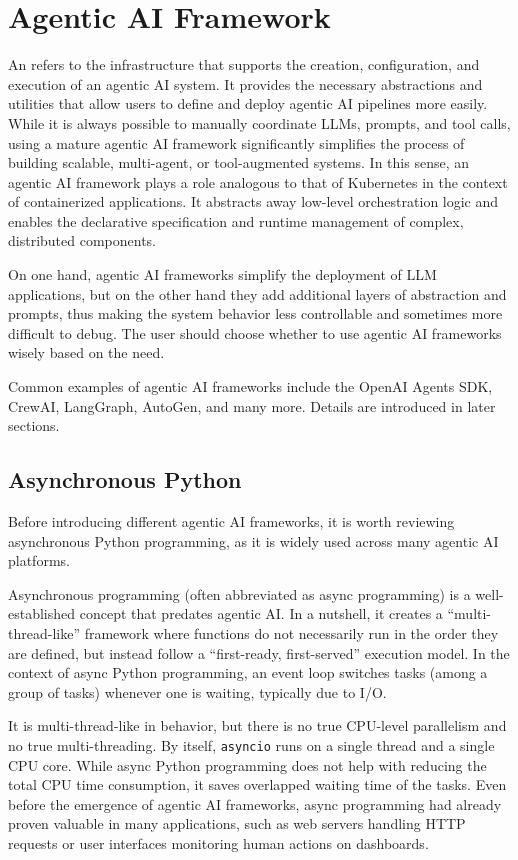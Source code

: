 \section{Agentic AI Framework} \label{sec:agentic_ai_frameworks}

An  refers to the infrastructure that supports the creation, configuration, and execution of an agentic AI system. It provides the necessary abstractions and utilities that allow users to define and deploy agentic AI pipelines more easily. While it is always possible to manually coordinate LLMs, prompts, and tool calls, using a mature agentic AI framework significantly simplifies the process of building scalable, multi-agent, or tool-augmented systems. In this sense, an agentic AI framework plays a role analogous to that of Kubernetes in the context of containerized applications. It abstracts away low-level orchestration logic and enables the declarative specification and runtime management of complex, distributed components. 

On one hand, agentic AI frameworks simplify the deployment of LLM applications, but on the other hand they add additional layers of abstraction and prompts, thus making the system behavior less controllable and sometimes more difficult to debug. The user should choose whether to use agentic AI frameworks wisely based on the need.

Common examples of agentic AI frameworks include the OpenAI Agents SDK, CrewAI, LangGraph, AutoGen, and many more. Details are introduced in later sections.

\subsection{Asynchronous Python}

Before introducing different agentic AI frameworks, it is worth reviewing asynchronous Python programming, as it is widely used across many agentic AI platforms.

Asynchronous programming (often abbreviated as async programming) is a well-established concept that predates agentic AI. In a nutshell, it creates a ``multi-thread-like'' framework where functions do not necessarily run in the order they are defined, but instead follow a ``first-ready, first-served'' execution model. In the context of async Python programming, an event loop switches tasks (among a group of tasks) whenever one is waiting, typically due to I/O. 

It is multi-thread-like in behavior, but there is no true CPU-level parallelism and no true multi-threading. By itself, \verb|asyncio| runs on a single thread and a single CPU core. While async Python programming does not help with reducing the total CPU time consumption, it saves overlapped waiting time of the tasks. Even before the emergence of agentic AI frameworks, async programming had already proven valuable in many applications, such as web servers handling HTTP requests or user interfaces monitoring human actions on dashboards. 

